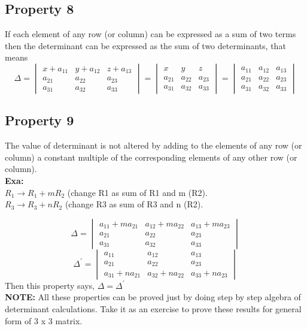 \documentclass{article}
\begin{document}
\subsection*{Property 8}
If each element of any row (or column) can be
expressed as a sum of two terms then the
determinant can be expressed as the sum of two
determinants, that means
\begin{equation*}
    \Delta=
    \begin{vmatrix}
        x+a_{11} & y+a_{12} & z+a_{13} \\
        a_{21} & a_{22} & a_{23} \\
        a_{31} & a_{32} & a_{33} 
    \end{vmatrix}
    =
    \begin{vmatrix}
        x & y & z \\
        a_{21} & a_{22} & a_{23} \\
        a_{31} & a_{32} & a_{33} 
    \end{vmatrix}
    =
    \begin{vmatrix}
        a_{11} & a_{12} & a_{13} \\
        a_{21} & a_{22} & a_{23} \\
        a_{31} & a_{32} & a_{33} 
    \end{vmatrix}
\end{equation*}
\subsection*{Property 9}
The value of determinant is not altered by adding to the elements of any row (or column) a constant multiple of the corresponding elements of any other row (or column).\\
\textbf{Exa: }\\
$R_1 \rightarrow R_1 + mR_2$ (change R1 as sum of R1 and m (R2).\\
$R_3 \rightarrow R_3 + nR_2$ (change R3 as sum of R3 and n (R2).

\begin{equation*}
    \Delta=
    \begin{vmatrix}
        a_{11}+ma_{21} & a_{12}+ma_{22} & a_{13}+ma_{23} \\
        a_{21} & a_{22} & a_{23} \\
        a_{31} & a_{32} & a_{33} 
    \end{vmatrix}
\end{equation*}
\begin{equation*}
    \Delta^{'}=
    \begin{vmatrix}
        a_{11} & a_{12} & a_{13} \\
        a_{21} & a_{22} & a_{23} \\
        a_{31}+na_{21} & a_{32}+na_{22} & a_{33}+na_{23} 
    \end{vmatrix}
\end{equation*}
Then this property says, $\Delta=\Delta^{'}$\\
\textbf{NOTE:} All these properties can be proved just by doing step by step algebra of determinant calculations. Take it as an exercise to prove these results for general form of 3 x 3 matrix.
\end{document}
